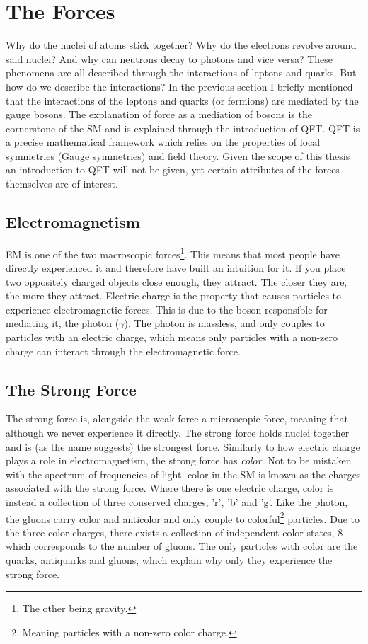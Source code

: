 \section{The Forces}
Why do the nuclei of atoms stick together? Why do the electrons revolve
around said nuclei? And why can neutrons decay to photons and vice versa? These phenomena 
are all described through the interactions of leptons and quarks. But how do we describe the 
interactions? In the previous section I briefly mentioned that the interactions of the leptons 
and quarks (or fermions) are mediated by the gauge bosons. The explanation of force as 
a mediation of bosons is the cornerstone of the \ac{SM} and is explained through 
the introduction of \ac{QFT}. \ac{QFT} is a precise mathematical framework which relies on the 
properties of local symmetries (Gauge symmetries) and field theory. Given the scope of this thesis
an introduction to \ac{QFT} will not be given, yet certain attributes of the forces themselves
are of interest. 
\subsection{Electromagnetism}
\acf{EM} is one of the two macroscopic forces\footnote{The other being gravity.}.
This means that most people have directly experienced it and therefore have built an intuition for
it. If you place two oppositely charged objects close enough, they attract. The closer they are, 
the more they attract. Electric charge is the property that causes particles to 
experience electromagnetic forces. This is due to the boson responsible for mediating it, 
the photon ($\gamma$). The photon is massless, and only couples to particles with an electric charge,
which means only particles with a non-zero charge can interact through the electromagnetic force.
\subsection{The Strong Force}
The strong force is, alongside the weak force a microscopic force, meaning that although 
we never experience it directly. The strong force 
holds nuclei together and is (as the name suggests) the strongest force. Similarly to how electric 
charge plays a role in electromagnetism, the strong force has \emph{color}. Not to be mistaken 
with the spectrum of frequencies of light, color in the \ac{SM} is known as the charges 
associated with the strong force. Where there is one electric charge, color is instead a collection 
of three conserved charges, 'r', 'b' and 'g'. Like the photon, the gluons carry color and anticolor
and only couple to colorful\footnote{Meaning particles with a non-zero color charge.} particles. 
Due to the three color charges, there exists a collection of independent color states, 8 which 
corresponds to the number of gluons. The only particles with color are the quarks, antiquarks and gluons, which explain why 
only they experience the strong force. 
